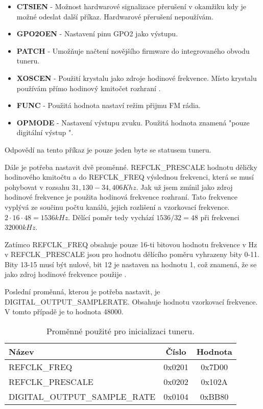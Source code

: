 \begin{itemize}
\item \textbf{CTSIEN} - Možnost hardwarové signalizace přerušení v okamžiku kdy je možné odeslat další příkaz. Hardwarové přerušení nepoužívám.
\item \textbf{GPO2OEN} - Nastavení pinu GPO2 jako výstupu.
\item \textbf{PATCH} - Umožňuje načtení novějšího firmware do integrovaného obvodu tuneru.
\item \textbf{XOSCEN} - Použití krystalu jako zdroje hodinové frekvence. Místo krystalu používám přímo hodinový kmitočet rozhraní \iis.
\item \textbf{FUNC} - Použitá hodnota nastaví režim přijmu FM rádia.
\item \textbf{OPMODE} - Nastavení výstupu zvuku. Použitá hodnota znamená "pouze digitální výstup \iis".
\end{itemize}

Odpovědí na tento příkaz je pouze jeden byte se statusem tuneru.

Dále je potřeba nastavit dvě proměnné. REFCLK\_PRESCALE hodnotu děličky hodinového kmitočtu a do REFCLK\_FREQ výslednou frekvenci, která se musí pohybovat v rozsahu $ 31,130 - 34,406 Khz $. Jak už jsem zmínil jako zdroj hodinové frekvence je použita hodinová frekvence \iis rozhraní. Tato frekvence vyplývá ze součinu počtu kanálů, jejich rozlišení a vzorkovací frekvence. $ 2 \cdot 16 \cdot 48 = 1536 kHz $. Dělící poměr tedy vychází $ 1536 / 32 = 48 $ při frekvenci $ 32000 kHz $.

Zatímco REFCLK\_FREQ obsahuje pouze 16-ti bitovou hodnotu frekvence v Hz v REFCLK\_PRESCALE jsou pro hodnotu dělícího poměru vyhrazeny bity 0-11. Bity 13-15 musí být nulové, bit 12 je nastaven na hodnotu 1, což znamená, že se jako zdroj hodinové frekvence použije \iis.

Poslední proměnná, kterou je potřeba nastavit, je DIGITAL\_OUTPUT\_SAMPLERATE. Obsahuje hodnotu vzorkovací frekvence. V tomto případě je to hodnota 48000.

\begin{table}[ht!]
\begin{center}
\begin{tabular}{|l|c|c|}
\hline 
Název & Číslo & Hodnota \\ 
\hline 
REFCLK\_FREQ & 0x0201 & 0x7D00 \\ 
\hline 
REFCLK\_PRESCALE & 0x0202 & 0x102A \\ 
\hline 
DIGITAL\_OUTPUT\_SAMPLE\_RATE & 0x0104 & 0xBB80 \\ 
\hline 
\end{tabular} 
\end{center}
\caption{Proměnné použité pro inicializaci tuneru.}
\label{tab:tuner-init-prop} 
\end{table}

